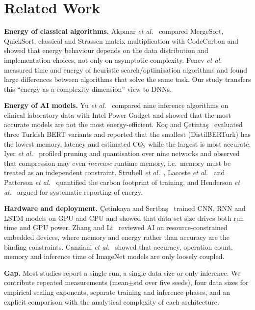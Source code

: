 \documentclass[conference]{IEEEtran}
\begin{document}
\section{Related Work}
\textbf{Energy of classical algorithms.} Akp{\i}nar \emph{et al.}~\cite{akpinar2026dc} compared MergeSort, QuickSort,
classical and Strassen matrix multiplication with CodeCarbon and showed that energy behaviour depends on the data
distribution and implementation choices, not only on asymptotic complexity. Penev \emph{et al.}~\cite{penev2024energy}
measured time and energy of heuristic search/optimisation algorithms and found large differences between algorithms
that solve the same task. Our study transfers this ``energy as a complexity dimension'' view to DNNs.

\textbf{Energy of AI models.} Yu \emph{et al.}~\cite{yu2022clinical} compared nine inference algorithms on clinical
laboratory data with Intel Power Gadget and showed that the most accurate models are not the most energy-efficient.
Ko{\c{c}} and {\c{C}}etinta{\c{s}}~\cite{koc2025berturk} evaluated three Turkish BERT variants and reported that
the smallest (DistilBERTurk) has the lowest memory, latency and estimated CO$_2$ while the largest is most accurate.
Iyer \emph{et al.}~\cite{iyer2026greenai} profiled pruning and quantisation over nine networks and observed that
compression may even \emph{increase} runtime memory, i.e.\ memory must be treated as an independent constraint.
Strubell \emph{et al.}~\cite{strubell2019energy}, Lacoste \emph{et al.}~\cite{lacoste2019quantifying} and
Patterson \emph{et al.}~\cite{patterson2021carbon} quantified the carbon footprint of training, and
Henderson \emph{et al.}~\cite{henderson2020systematic} argued for systematic reporting of energy.

\textbf{Hardware and deployment.} {\c{C}}etinkaya and Sertba{\c{s}}~\cite{cetinkaya2022gpucpu} trained CNN, RNN and
LSTM models on GPU and CPU and showed that data-set size drives both run time and GPU power. Zhang and
Li~\cite{zhang2023embedded} reviewed AI on resource-constrained embedded devices, where memory and energy rather than
accuracy are the binding constraints. Canziani \emph{et al.}~\cite{canziani2016analysis} showed that accuracy,
operation count, memory and inference time of ImageNet models are only loosely coupled.

\textbf{Gap.} Most studies report a single run, a single data size or only inference. We contribute repeated
measurements (mean$\pm$std over five seeds), four data sizes for empirical scaling exponents, separate training and
inference phases, and an explicit comparison with the analytical complexity of each architecture.
\end{document}
